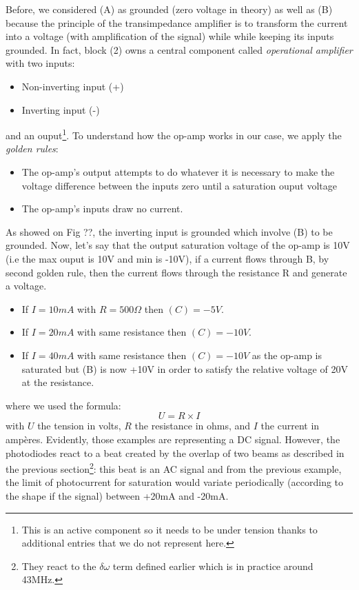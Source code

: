 \documentclass[10pt]{report}
\begin{document}
Before, we considered (A) as grounded (zero voltage in theory) as well as (B) because the principle of the transimpedance amplifier is to transform the current into a voltage (with amplification of the signal) while while keeping its inputs grounded. In fact, block (2) owns a central component called \textit{operational amplifier} with two inputs:
\begin{itemize}
 \item Non-inverting input (+)
 \item Inverting input (-)
\end{itemize}
and an ouput\footnote{This is an active component so it needs to be under tension thanks to additional entries that we do not represent here.}. To understand how the op-amp works in our case, we apply the \textit{golden rules}:
\begin{itemize}
 \item The op-amp's output attempts to do whatever it is necessary to make the voltage difference between the inputs zero until a saturation ouput voltage
 \item The op-amp's inputs draw no current.
\end{itemize} As showed on Fig ??, the inverting input is grounded which involve (B) to be grounded. Now, let's say that the output saturation voltage of the op-amp is 10V (i.e the max ouput is 10V and min is -10V), if a current flows through B, by second golden rule, then the current flows through the resistance R and generate a voltage.
\begin{itemize}
	\item If $I = 10mA$ with $R = 500\Omega$ then $(C) = -5V$.
	\item If $I = 20mA$ with same resistance then $(C) = -10V$.
	\item If $I = 40mA$ with same resistance then $(C) = -10V$ as the op-amp is saturated but (B) is now +10V in order to satisfy the relative voltage of 20V at the resistance.
\end{itemize}
where we used the formula:
\begin{equation}
\label{ueqri}
U = R \times I
\end{equation}
with $U$ the tension in volts, $R$ the resistance in ohms, and $I$ the current in ampères. Evidently, those examples are representing a DC signal. However, the photodiodes react to a beat created by the overlap of two beams as described in the previous section\footnote{They react to the $\delta\omega$ term defined earlier which is in practice around 43MHz.}: this beat is an AC signal and from the previous example, the limit of photocurrent for saturation would variate periodically (according to the shape if the signal) between +20mA and -20mA.
\end{document}
